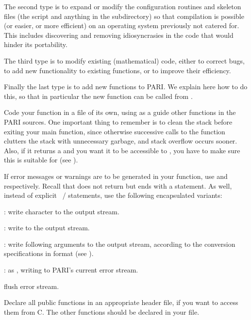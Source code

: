 The second type is to expand or modify the configuration routines and skeleton
files (the  script and anything in the 
subdirectory) so that compilation is possible (or easier, or more efficient)
on an operating system previously not catered for. This includes discovering
and removing idiosyncrasies in the code that would hinder its portability.

The third type is to modify existing (mathematical) code, either to correct
bugs, to add new functionality to existing functions, or to improve their
efficiency.

Finally the last type is to add new functions to PARI. We explain here how
to do this, so that in particular the new function can be called from .

\label{se:coding_guidelines}
\noindent
Code your function in a file of its own, using as a guide other functions
in the PARI sources. One important thing to remember is to clean the stack
before exiting your main function, since otherwise successive calls to
the function clutters the stack with unnecessary garbage, and stack
overflow occurs sooner. Also, if it returns a  and you want it
to be accessible to , you have to make sure this  is
suitable for  (see ).

If error messages or warnings are to be generated in your function, use
 and  respectively.
Recall that  does not return but ends with a 
statement. As well, instead of explicit ~/ 
statements, use the following encapsulated variants:

: write character  to the output stream.

: write  to the output stream.

: write following arguments to the
output stream, according to the conversion specifications in format 
(see ).

: as , writing to
PARI's current error stream.

 flush error stream.

Declare all public functions in an appropriate header file, if you
want to access them from C. The other functions should be declared
 in your file.

